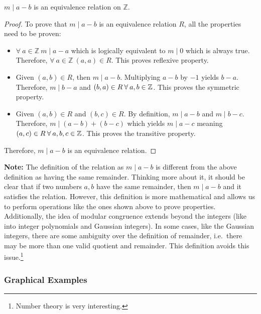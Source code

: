\begin{proposition}
    \(m\mid a-b\) is an equivalence relation on \(\mathbb{Z}\).
\end{proposition}
\begin{proof}
    To prove that \(m\mid a-b\) is an equivalence relation \(R\), all the properties need to be proven:
    \begin{itemize}
        \item \(\forall\:a\in\mathbb{Z}\:m\mid a-a\) which is logically equivalent to \(m\mid 0\) which is always true.
        Therefore, \(\forall\:a\in\mathbb{Z}\:(a,a)\in R\). This proves reflexive property.
        \item Given \((a,b)\in R\), then \(m\mid a-b\). Multiplying \(a-b\) by \(-1\) yields \(b-a\). Therefore, \(m\mid b-a\)
        and \((b,a)\in R\:\forall\: a,b\in\mathbb{Z}\). This proves the symmetric property.
        \item Given \((a,b)\in R\) and \((b,c)\in R\). By definition, \(m\mid a-b\) and \(m\mid b-c\). Therefore, \(m\mid(a-b)+(b-c)\)
        which yields \(m\mid a-c\) meaning \((a,c)\in R\:\forall\: a,b,c\in\mathbb{Z}\). This proves the transitive property. 
    \end{itemize}
    Therefore, \(m\mid a-b\) is an equivalence relation.
\end{proof}

\textbf{Note:} The definition of the relation as \(m\mid a-b\) is different from the above definition as having the same remainder.
Thinking more about it, it should be clear that if two numbers \(a,b\) have the same remainder, then \(m\mid a-b\) and it satisfies the 
relation. However, this definition is more mathematical and allows us to perform operations like the ones shown above to prove properties.
Additionally, the idea of modular congruence extends beyond the integers (like into integer polynomials and Gaussian integers). In some
cases, like the Gaussian integers, there are some ambiguity over the definition of remainder, i.e.\ there may be more than one valid 
quotient and remainder. This definition avoids this issue.\footnote{Number theory is very interesting.}

\subsubsection{Graphical Examples}

